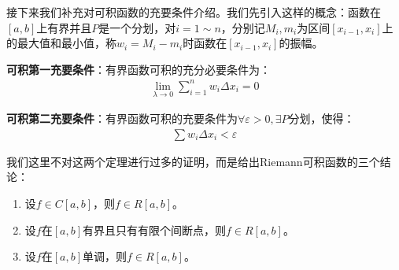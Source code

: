 \documentclass{ctexart}
\let\oldtextbf\textbf %
\renewcommand{\textbf}[1]{\textcolor{btex}{\oldtextbf{#1}}} %
\begin{document}
接下来我们补充对可积函数的充要条件介绍。我们先引入这样的概念：函数在$[a,b]$上有界并且$P$是一个分划，对$i=1\sim n$，分别记$M_i,m_i$为区间$[x_{i-1},x_i]$上的最大值和最小值，称$w_i=M_i-m_i$时函数在$[x_{i-1},x_i]$的振幅。

\begin{tcolorbox}[
    colback=bac1,     %
    colframe=fra1,   %
    coltitle=white,             %
    coltext=tex1,
    title=可积的充要条件,
    fonttitle=\bfseries,        %
arc=3mm,                     %
breakable
]
\textbf{可积第一充要条件}：有界函数可积的充分必要条件为：
\begin{align*}
    \lim_{\lambda\to 0}\sum_{i=1}^n w_i\Delta x_i=0\tag{5-2}
\end{align*}

\textbf{可积第二充要条件}：有界函数可积的充要条件为$\forall \varepsilon>0,\exists P$分划，使得：
\begin{align*}
    \sum w_i\Delta x_i<\varepsilon\tag{5-3}
\end{align*}
\end{tcolorbox}

我们这里不对这两个定理进行过多的证明，而是给出Riemann可积函数的三个结论：
\begin{tcolorbox}[
    colback=bac2,     %
    colframe=fra2,   %
    coltitle=white,             %
    coltext=tex2,
    title=黎曼可积函数的性质,
    fonttitle=\bfseries,        %
arc=3mm,                     %
breakable
]
\begin{enumerate}
    \item 设$f\in C[a,b]$，则$f\in R[a,b]$。
    \item 设$f$在$[a,b]$有界且只有有限个间断点，则$f\in R[a,b]$。 
    \item 设$f$在$[a,b]$单调，则$f\in R[a,b]$。
\end{enumerate}
\end{tcolorbox}
\end{document}
